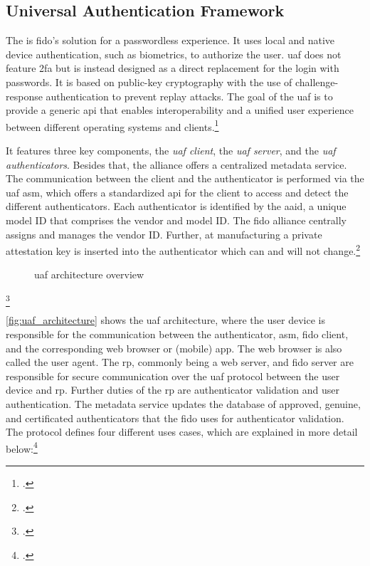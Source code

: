 \subsection{Universal Authentication Framework}

The  is \gls{fido}'s solution for a passwordless experience. It uses local and native device authentication, such as biometrics, to authorize the user. \gls{uaf} does not feature \gls{2fa} but is instead designed as a direct replacement for the login with passwords. It is based on public-key cryptography with the use of challenge-response authentication to prevent replay attacks. The goal of the \gls{uaf} is to provide a generic \gls{api} that enables interoperability and a unified user experience between different operating systems and clients.\footcites[See][249]{Schwartz2018}[See][197--198]{dasgupta2017multi}

It features three key components, the \textit{\gls{uaf} client}, the \textit{\gls{uaf} server}, and the \textit{\gls{uaf} authenticators}. Besides that, the alliance offers a centralized metadata service. The communication between the client and the authenticator is performed via the \gls{uaf} \gls{asm}, which offers a standardized \gls{api} for the client to access and detect the different authenticators. Each authenticator is identified by the \gls{aaid}, a unique model ID that comprises the vendor and model ID. The \gls{fido} alliance centrally assigns and manages the vendor ID. Further, at manufacturing a private attestation key is inserted into the authenticator which can and will not change.\footcites[See][145]{10.1007/978-3-319-26502-5_10}[See][8]{uaf-protocol}

\begin{figure}[hbt]
	\centering
	
	\caption[\gls{uaf} architecture overview]{\gls{uaf} architecture overview\footnotemark}
	\label{fig:uaf_architecture}
\end{figure}
\footcitetext[Source: diagram by author, based on][4]{uaf-overview}

\autoref{fig:uaf_architecture} shows the \gls{uaf} architecture, where the user device is responsible for the communication between the authenticator, \gls{asm}, \gls{fido} client, and the corresponding web browser or (mobile) app. The web browser is also called the user agent. The \gls{rp}, commonly being a web server, and \gls{fido} server are responsible for secure communication over the \gls{uaf} protocol between the user device and \gls{rp}. Further duties of the \gls{rp} are authenticator validation and user authentication. The metadata service updates the database of approved, genuine, and certificated authenticators that the \gls{fido} uses for authenticator validation. The protocol defines four different uses cases, which are explained in more detail below:\footcites[See][4]{uaf-protocol}

